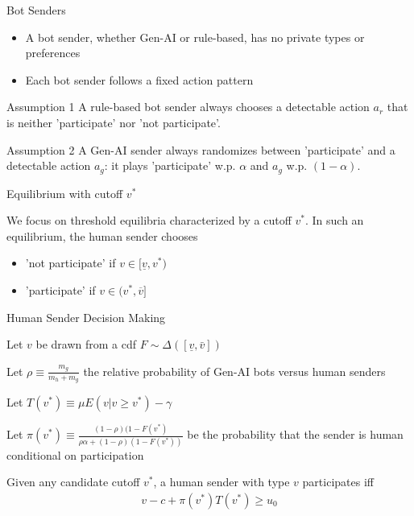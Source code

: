 \documentclass[11pt,aspectratio=169]{beamer}
\begin{document}
\begin{frame}{Bot Senders}
\begin{itemize}\setlength{\itemsep}{1em}
    \item A bot sender, whether Gen-AI or rule-based, has no private types or preferences
    \item Each bot sender follows a fixed action pattern
\end{itemize}
\vspace{1em}

\begin{exampleblock}{Assumption 1}
    A rule-based bot sender always chooses a detectable action $a_r$ that is neither 'participate' nor 'not participate'.
\end{exampleblock}

\begin{exampleblock}{Assumption 2}
    A Gen-AI sender always randomizes between 'participate' and a detectable action $a_g$: it plays 'participate' w.p. $\alpha$ and $a_g$ w.p. $(1-\alpha)$.
\end{exampleblock}
\end{frame}

\begin{frame}{Equilibrium with cutoff $v^*$}

We focus on threshold equilibria characterized by a cutoff $v^*$. In such an equilibrium, the human sender chooses
\begin{itemize}
    \item 'not participate' if $v\in [\underline{v},v^*)$
    \item 'participate' if $v\in (v^*,\overline{v}]$
\end{itemize}

\end{frame}

\begin{frame}{Human Sender Decision Making}

Let $v$ be drawn from a cdf $F\sim \Delta([\underline{v},\bar{v}])$
\vspace{1em}

Let $\rho\equiv\frac{m_g}{m_h+m_g}$ the relative probability of Gen-AI bots versus human senders

\vspace{1em}

Let $T(v^*)\equiv \mu E(v|v\geq v^*) - \gamma$

\vspace{1em}

Let $\pi(v^*)\equiv \frac{(1-\rho)(1-F(v^*)}{\rho\alpha + (1-\rho)(1-F(v^*))}$ be the probability that the sender is human conditional on participation

\vspace{1em}
Given any candidate cutoff $v^*$, a human sender with type $v$ participates iff
\begin{align*}
    v - c + \pi(v^*)T(v^*)\geq u_0
\end{align*}
    
\end{frame}
\end{document}
